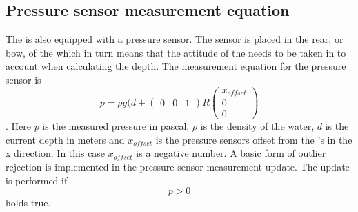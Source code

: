 \subsection{Pressure sensor measurement equation}
The \abbrROV is also equipped with a pressure sensor. The sensor is placed in the rear, or bow, of the \abbrROV which in turn means that the attitude of the \abbrROV needs to be taken in to account when calculating the depth.
The measurement equation for the pressure sensor is
\begin{equation}
p =  \rho g (d + \begin{pmatrix}
    0 & 0 & 1
\end{pmatrix} R 
\begin{pmatrix}
x_{offset}\\
0\\
0
\end{pmatrix}
\end{equation}.
Here $p$ is the measured pressure in pascal, $\rho$ is the density of the water, $d$ is the current depth in meters and $x_{offset}$ is the pressure sensors offset from the \abbrROV's \abbrCO in the x direction. In this case $x_{offset}$ is a negative number. A basic form of outlier rejection is implemented in the pressure sensor measurement update. The update is performed if
\begin{equation}
    p > 0
\end{equation}
holds true.
